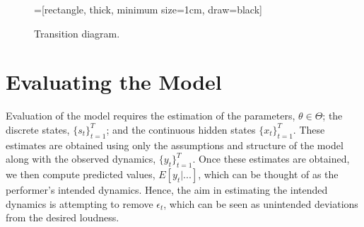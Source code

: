 \documentclass[12pt]{article}
\begin{document}
\begin{figure}[tb!]
\caption{Transition diagram. \label{fig:transmat}}
  \centering
  =[rectangle,
  thick, minimum size=1cm, draw=black]
\end{figure}

\section{Evaluating the Model}
\label{sec:analysis}

Evaluation of the model requires the estimation of the parameters,
\(\theta \in \Theta\); the discrete states, \(\{s_t\}^T_{t=1}\); and the
continuous hidden states \(\{x_t\}^T_{t=1}\). These estimates are
obtained using only the assumptions and structure of the model along
with the observed dynamics, \(\{y_t\}^T_{t=1}\). Once these estimates
are obtained, we then compute predicted values, \(E[y_t|...]\), which
can be thought of as the performer's intended dynamics. Hence, the aim
in estimating the intended dynamics is attempting to remove
\(\epsilon_t\), which can be seen as unintended deviations from the
desired loudness.
\end{document}

